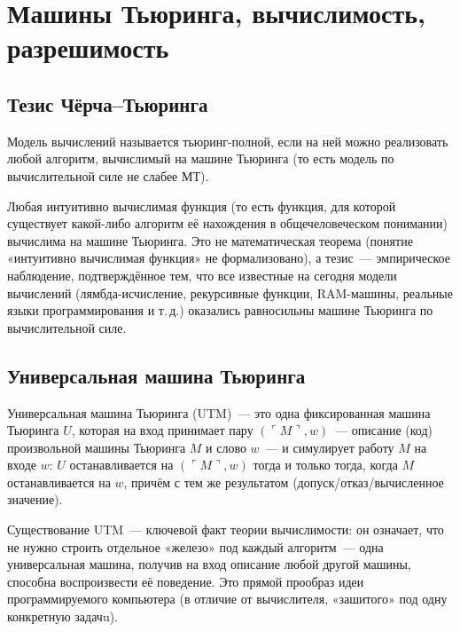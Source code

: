 \documentclass[12pt]{article}
\begin{document}
    \section{Машины Тьюринга, вычислимость, разрешимость}
    
    \subsection{Тезис Чёрча--Тьюринга}
    
    \begin{definition}
    	Модель вычислений называется тьюринг-полной, если на ней можно реализовать любой алгоритм, вычислимый на машине Тьюринга (то есть модель по вычислительной силе не слабее МТ).
    \end{definition}
    
    \begin{note}
    	Любая интуитивно вычислимая функция (то есть функция, для которой существует какой-либо алгоритм её нахождения в общечеловеческом понимании) вычислима на машине Тьюринга. Это не математическая теорема (понятие «интуитивно вычислимая функция» не формализовано), а тезис~--- эмпирическое наблюдение, подтверждённое тем, что все известные на сегодня модели вычислений (лямбда-исчисление, рекурсивные функции, RAM-машины, реальные языки программирования и т.\,д.) оказались равносильны машине Тьюринга по вычислительной силе.
    \end{note}
    
    \subsection{Универсальная машина Тьюринга}
    
    \begin{definition}[UTM]
    	Универсальная машина Тьюринга (UTM)~--- это одна фиксированная машина Тьюринга $U$, которая на вход принимает пару $(\ulcorner M \urcorner, w)$~--- описание (код) произвольной машины Тьюринга $M$ и слово $w$~--- и симулирует работу $M$ на входе $w$: $U$ останавливается на $(\ulcorner M \urcorner, w)$ тогда и только тогда, когда $M$ останавливается на $w$, причём с тем же результатом (допуск/отказ/вычисленное значение).
    \end{definition}
    
    \begin{note}
    	Существование UTM~--- ключевой факт теории вычислимости: он означает, что не нужно строить отдельное «железо» под каждый алгоритм~--- одна универсальная машина, получив на вход описание любой другой машины, способна воспроизвести её поведение. Это прямой прообраз идеи программируемого компьютера (в отличие от вычислителя, «зашитого» под одну конкретную задачu).
    \end{note}
    
\end{document}
